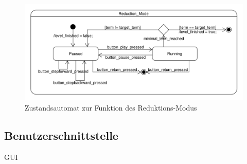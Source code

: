 \begin{figure}[H]
\centering
\includegraphics[scale=0.55]{../system_models/dynamic_models/reduction_mode_state_machine.pdf}
\caption{Zustandsautomat zur Funktion des Reduktions-Modus}
\end{figure}

\subsection{Benutzerschnittstelle}

GUI